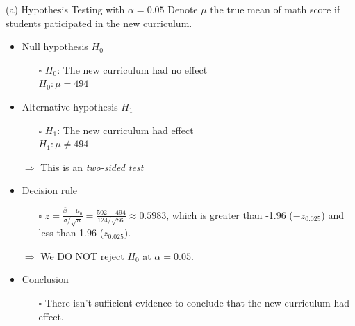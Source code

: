 \documentclass[
  10pt,
  ignorenonframetext,
]{beamer}
\begin{document}
\begin{frame}{(a) Hypothesis Testing with \(\alpha = 0.05\)}
\protect\hypertarget{a-hypothesis-testing-with-alpha-0.05-3}{}
Denote \(\mu\) the true mean of math score if students paticipated in
the new curriculum.\\

\begin{itemize}
    \item Null hypothesis $H_0$
        \begin{itemize}
            \item [$\square$] $H_0$: The new curriculum had no effect\\
                  $H_0: \mu = 494$
    \end{itemize}
    \vspace{1.5mm}
    \item Alternative hypothesis $H_1$
        \begin{itemize}
            \item [$\square$] $H_1$: The new curriculum had effect\\
                  $H_1: \mu \neq 494$\\
        \end{itemize}
        $\Longrightarrow$ This is an \textit{two-sided test}
    \vspace{1.5mm}
    \item Decision rule
        \begin{itemize}
            \item [$\square$] $z = \frac{\bar{x}-\mu_0}{\sigma/\sqrt{n}} = \frac{502 - 494}{124/\sqrt{86}} \approx 0.5983$, which is greater than -1.96 ($-z_{0.025}$) and less than 1.96 ($z_{0.025}$).\\
        \end{itemize}
        $\Longrightarrow$ We DO NOT reject $H_0$ at $\alpha = 0.05$.
    \vspace{1.5mm}
    \item Conclusion
    \pause
        \begin{itemize}
            \item [$\square$] There isn't sufficient evidence to conclude that the new curriculum had effect.
        \end{itemize}
\end{itemize}
\end{frame}
\end{document}
